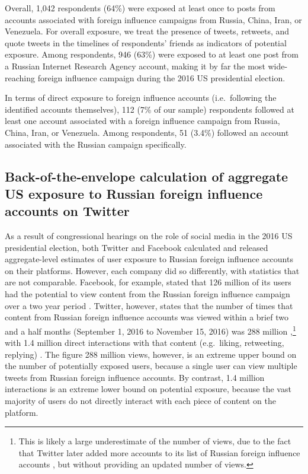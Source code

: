 \documentclass[
  12pt,
]{article}
\begin{document}
Overall, 1,042 respondents (64\%) were exposed at least once to posts from accounts associated with foreign influence campaigns from Russia, China, Iran, or Venezuela. For overall exposure, we treat the presence of tweets, retweets, and quote tweets in the timelines of respondents' friends as indicators of potential exposure. Among respondents, 946 (63\%) were exposed to at least one post from a Russian Internet Research Agency account, making it by far the most wide-reaching foreign influence campaign during the 2016 US presidential election.

In terms of direct exposure to foreign influence accounts (i.e.~following the identified accounts themselves), 112 (7\% of our sample) respondents followed at least one account associated with a foreign influence campaign from Russia, China, Iran, or Venezuela. Among respondents, 51 (3.4\%) followed an account associated with the Russian campaign specifically.

\clearpage

\hypertarget{back-of-the-envelope-calculation-of-aggregate-us-exposure-to-russian-foreign-influence-accounts-on-twitter}{%
\subsection{Back-of-the-envelope calculation of aggregate US exposure to Russian foreign influence accounts on Twitter}\label{back-of-the-envelope-calculation-of-aggregate-us-exposure-to-russian-foreign-influence-accounts-on-twitter}}

As a result of congressional hearings on the role of social media in the 2016 US presidential election, both Twitter and Facebook calculated and released aggregate-level estimates of user exposure to Russian foreign influence accounts on their platforms. However, each company did so differently, with statistics that are not comparable. Facebook, for example, stated that 126 million of its users had the potential to view content from the Russian foreign influence campaign over a two year period \citep{Stretch2017}. Twitter, however, states that the number of times that content from Russian foreign influence accounts was viewed within a brief two and a half months (September 1, 2016 to November 15, 2016) was 288 million \citep{Edgett2017},\footnote{This is likely a large underestimate of the number of views, due to the fact that Twitter later added more accounts to its list of Russian foreign influence accounts \citep{Twitter2018}, but without providing an updated number of views.} with 1.4 million direct interactions with that content (e.g.~liking, retweeting, replying) \citep{Twitter2018}. The figure 288 million views, however, is an extreme upper bound on the number of potentially exposed users, because a single user can view multiple tweets from Russian foreign influence accounts. By contrast, 1.4 million interactions is an extreme lower bound on potential exposure, because the vast majority of users do not directly interact with each piece of content on the platform.
\end{document}
